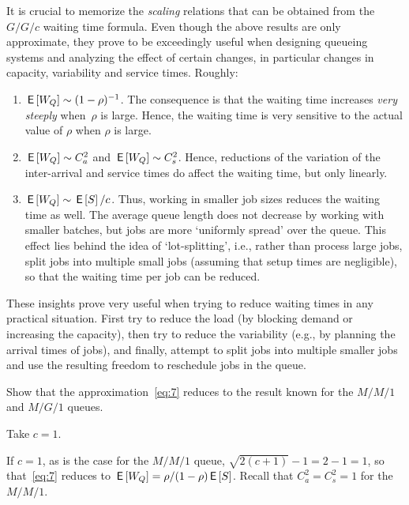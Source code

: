 It is crucial to memorize the \emph{scaling} relations that can be obtained from the $G/G/c$ waiting time formula.
Even though the above results are only approximate, they prove to be exceedingly useful when designing queueing systems and analyzing the effect of certain changes, in particular changes in capacity, variability and service times.
Roughly:
\begin{enumerate}
\item $\,\mathsf{E}\left[W_Q\right] \sim (1-\rho)^{-1}$. The consequence is that the waiting
  time increases \emph{very steeply} when~$\rho$ is large. Hence, the waiting time is
  very sensitive to the actual value of $\rho$ when $\rho$ is large.
\item $\,\mathsf{E}\left[W_Q\right] \sim C_a^2$ and $\,\mathsf{E}\left[W_Q\right] \sim C_s^2$.
  Hence, reductions of the variation of the inter-arrival and service times do affect the waiting time, but only linearly.
\item $\,\mathsf{E}\left[W_Q\right] \sim \,\mathsf{E}\left[S\right]/c$.
  Thus, working in smaller job sizes reduces the waiting time as well.
  The average queue length does not decrease by working with smaller batches, but jobs are more `uniformly spread' over the queue.
  This effect lies behind the idea of `lot-splitting', i.e., rather than process large jobs, split jobs into multiple small jobs (assuming that setup times are negligible), so that the waiting time per job can be reduced.
\end{enumerate}

These insights prove very useful when trying to reduce waiting times in any practical situation.
First try to reduce the load (by blocking demand or increasing the capacity), then try to reduce the variability (e.g., by planning the arrival times of jobs), and finally, attempt to split jobs into multiple smaller jobs and use the resulting freedom to reschedule jobs in the queue.




\begin{exercise}
  Show that the approximation~\cref{eq:7} reduces to the result known for the $M/M/1$ and $M/G/1$ queues.
\begin{hint}
 Take $c=1$.
\end{hint}
\begin{solution}
    If $c=1$, as is the case for the $M/M/1$ queue, $\sqrt{2(c+1)} - 1=2-1=1$, so that~\cref{eq:7} reduces to $\,\mathsf{E}\left[W_Q\right] = \rho/(1-\rho) \,\mathsf{E}\left[S\right]$. Recall that $C_a^2=C_s^2=1$ for the $M/M/1$. 
\end{solution}
\end{exercise}



